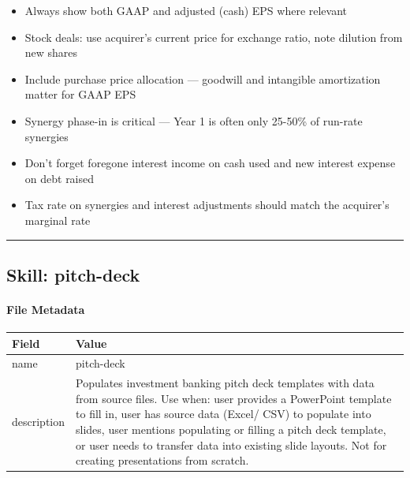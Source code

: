 \documentclass[11pt]{article}
\begin{document}
\begin{itemize}[leftmargin=*,itemsep=2pt,topsep=2pt]
\item {} Always show both GAAP and adjusted (cash) EPS where relevant
\item {} Stock deals: use acquirer's current price for exchange ratio, note dilution from new shares
\item {} Include purchase price allocation — goodwill and intangible amortization matter for GAAP EPS
\item {} Synergy phase-in is critical — Year 1 is often only 25-50\% of run-rate synergies
\item {} Don't forget foregone interest income on cash used and new interest expense on debt raised
\item {} Tax rate on synergies and interest adjustments should match the acquirer's marginal rate
\end{itemize}

\vspace{0.8em}\hrule\vspace{0.8em}

\subsection{Skill: pitch-deck}\label{file:skills-pitch-deck-SKILL.md}

\paragraph{File Metadata}\mbox{}\par
\begingroup
\small
\setlength{\tabcolsep}{2pt}
\begin{longtable}{>{\RaggedRight\arraybackslash\hspace{0pt}}p{}>{\RaggedRight\arraybackslash\hspace{0pt}}p{}}
\toprule
{} \textbf{Field} & \textbf{Value} \\
\midrule
{} name & pitch-deck \\
{} description & Populates investment banking pitch deck templates with data from source files. Use when: user provides a PowerPoint template to fill in, user has source data (Excel/ CSV) to populate into slides, user mentions populating or filling a pitch deck template, or user needs to transfer data into existing slide layouts. Not for creating presentations from scratch. \\
\bottomrule
\end{longtable}
\endgroup
\end{document}
